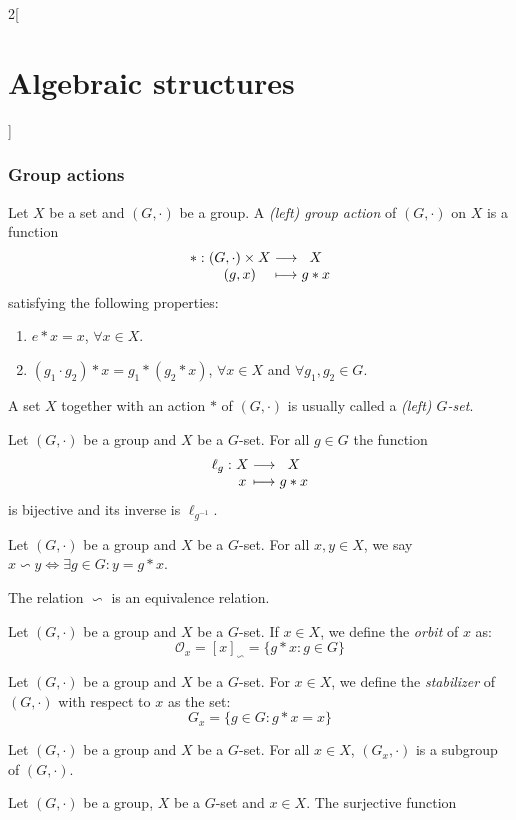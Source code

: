 \documentclass[../../../main_math.tex]{subfiles}
\begin{document}
\begin{multicols}{2}[\section{Algebraic structures}]
  \subsubsection{Group actions}
  \begin{definition}
    Let $X$ be a set and $(G,\cdot)$ be a group. A \emph{(left) group action} of $(G,\cdot)$ on $X$ is a function
    $$\function{*}{(G,\cdot)\times X}{X}{(g,x)}{g*x}$$
    satisfying the following properties:
    \begin{enumerate}
      \item $e*x=x$, $\forall x\in X$.
      \item $(g_1\cdot g_2)*x=g_1*(g_2*x)$, $\forall x\in X$ and $\forall g_1,g_2\in G$.
    \end{enumerate}
    A set $X$ together with an action $*$ of $(G,\cdot)$ is usually called a \emph{(left) $G$-set}.
  \end{definition}
  \begin{lemma}
    Let $(G,\cdot)$ be a group and $X$ be a $G$-set. For all $g\in G$ the function
    $$\function{\ell_g}{X}{X}{x}{g*x}$$ is bijective and its inverse is $\ell_{g^{-1}}$.
  \end{lemma}
  \begin{definition}
    Let $(G,\cdot)$ be a group and $X$ be a $G$-set. For all $x,y\in X$, we say $x\backsim y\iff\exists g\in G:y=g*x$.
  \end{definition}
  \begin{lemma}
    The relation $\backsim$ is an equivalence relation.
  \end{lemma}
  \begin{definition}
    Let $(G,\cdot)$ be a group and $X$ be a $G$-set. If $x\in X$, we define the \emph{orbit} of $x$ as: $$\mathcal{O}_x=[x]_\backsim=\{g*x:g\in G\}$$
  \end{definition}
  \begin{definition}
    Let $(G,\cdot)$ be a group and $X$ be a $G$-set. For $x\in X$, we define the \emph{stabilizer} of $(G,\cdot)$ with respect to $x$ as the set: $$G_x=\{g\in G:g*x=x\}$$
  \end{definition}
  \begin{proposition}
    Let $(G,\cdot)$ be a group and $X$ be a $G$-set. For all $x\in X$, $(G_x,\cdot)$ is a subgroup of $(G,\cdot)$.
  \end{proposition}
  \begin{theorem}
    Let $(G,\cdot)$ be a group, $X$ be a $G$-set and $x\in X$. The surjective function

\end{theorem}
\end{multicols}
\end{document}
